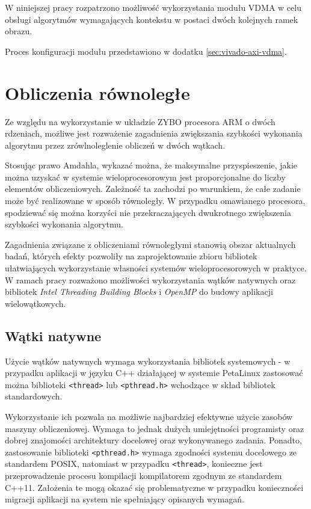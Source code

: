 W niniejszej pracy rozpatrzono możliwość wykorzystania modułu VDMA w celu obsługi algorytmów wymagających kontekstu w postaci dwóch kolejnych ramek obrazu.

Proces konfiguracji modułu przedstawiono w dodatku \ref{sec:vivado-axi-vdma}.

\section{Obliczenia równoległe}
\label{sec:openmp}

Ze względu na wykorzystanie w układzie ZYBO procesora ARM o dwóch rdzeniach, możliwe jest rozważenie zagadnienia zwiększania szybkości wykonania algorytmu przez zrówlnoleglenie obliczeń w dwóch wątkach.

Stosując prawo Amdahla, wykazać można, że maksymalne przyspieszenie, jakie można uzyskać w systemie wieloprocesorowym jest proporcjonalne do liczby elementów obliczeniowych. Zależność ta zachodzi po warunkiem, że całe zadanie może być realizowane w sposób równoległy. W przypadku omawianego procesora, spodziewać się można korzyści nie przekraczających dwukrotnego zwiększenia szybkości wykonania algorytmu.

Zagadnienia związane z obliczeniami równoległymi stanowią obszar aktualnych badań, których efekty pozwoliły na zaprojektowanie zbioru bibliotek ułatwiających wykorzystanie własności systemów wieloprocesorowych w praktyce. W ramach pracy rozważono możliwości wykorzystania wątków natywnych oraz bibliotek \emph{Intel Threading Building Blocks} i \emph{OpenMP} do budowy aplikacji wielowątkowych.


\subsection{Wątki natywne}

Użycie wątków natywnych wymaga wykorzystania bibliotek systemowych - w przypadku aplikacji w języku C++ działającej w systemie PetaLinux zastosować można biblioteki \texttt{<thread>} lub \texttt{<pthread.h>} wchodzące w skład bibliotek standardowych. \cite{Williams2013}
 
Wykorzystanie ich pozwala na możliwie najbardziej efektywne użycie zasobów maszyny obliczeniowej. Wymaga to jednak dużych umiejętności programisty oraz dobrej znajomości architektury docelowej oraz wykonywanego zadania. Ponadto, zastosowanie biblioteki \texttt{<pthread.h>} wymaga zgodności systemu docelowego ze standardem POSIX, natomiast w przypadku \texttt{<thread>}, konieczne jest przeprowadzenie procesu kompilacji kompilatorem zgodnym ze standardem C++11. Założenia te mogą okazać się problematyczne w przypadku konieczności migracji aplikacji na system nie spełniający opisanych wymagań.


